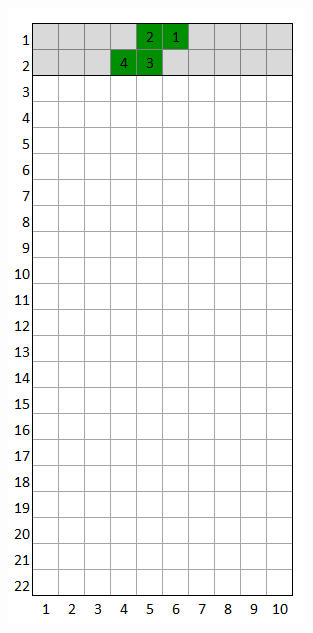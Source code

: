 \documentclass[a4paper]{article}
\begin{document}
	\begin{minipage}{0.33\textwidth}
		\centering
		\includegraphics[scale=0.4]{resources/img/minoes/mino_green}
		\label{fig:mino-green}
	\end{minipage}
\end{document}
